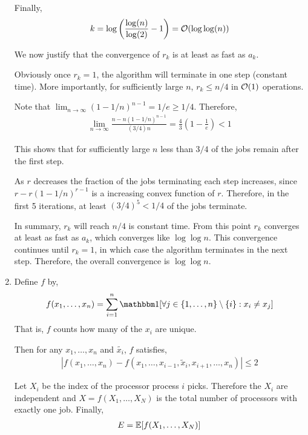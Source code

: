 \documentclass[10pt]{article}
\begin{document}
\begin{solution}[Solution]
\begin{enumerate}[label=(\alph*)]
    Finally,
    \begin{align*}
        k = \log \left( \frac{\log(n)}{\log(2)} - 1 \right) = \mathcal{O}(\log \log(n))
    \end{align*}
    
    We now justify that the convergence of \( r_k \) is at least as fast as \( a_k \). 
    
    Obviously once \( r_k = 1 \), the algorithm will terminate in one step (constant time). More importantly, for sufficiently large \( n \), \( r_k \leq n/4 \) in \( \mathcal{O}(1) \) operations.

    Note that \( \lim_{n\to\infty} (1-1/n)^{n-1} = 1/e \geq 1/4 \). Therefore, 
    \begin{align*}
        \lim_{n\to\infty} \frac{n-n(1-1/n)^{n-1}}{(3/4)n} = \frac{4}{3} \left( 1 - \frac{1}{e} \right) < 1
    \end{align*}

    This shows that for sufficiently large \( n \) less than \( 3/4 \) of the jobs remain after the first step. 
    
    As \( r \) decreases the fraction of the jobs terminating each step increases, since \( r-r(1-1/n)^{r-1} \) is a increasing convex function of \( r \).
    Therefore, in the first 5 iterations, at least \( (3/4)^5 < 1/4 \) of the jobs terminate.


    In summary, \( r_k \) will reach \( n/4 \) is constant time. From this point \( r_k \) converges at least as fast as \( a_k \), which converges like \( \log \log n \). This convergence continues until \( r_k = 1 \), in which case the algorithm terminates in the next step. Therefore, the overall convergence is \( \log\log n \).


\item Define \( f \) by,
    \begin{align*}
        f(x_1,\ldots, x_n) = \sum_{i=1}^{n} \bOne[\forall j \in\{1,\ldots,n\} \setminus\{i\}: x_i \neq x_j ]
    \end{align*}
    That is, \( f \) counts how many of the \( x_i \) are unique.
    
    Then for any \( x_1,\ldots, x_n \) and \( \tilde{x_i} \), \( f \) satisfies,
    \begin{align*}
        |f(x_1,\ldots,x_n) - f(x_1,\ldots,x_{i-1},\tilde{x}_i,x_{i+1},\ldots,x_n)| \leq 2
    \end{align*}

    Let \( X_i \) be the index of the processor process \( i \) picks. Therefore the \( X_i \) are independent and \( X = f(X_1,\ldots, X_N) \) is the total number of processors with exactly one job. Finally,
    \begin{align*}
        E = \mathbb{E}[f(X_1,\ldots, X_N)]
    \end{align*}
    

\end{enumerate}
\end{solution}
\end{document}
